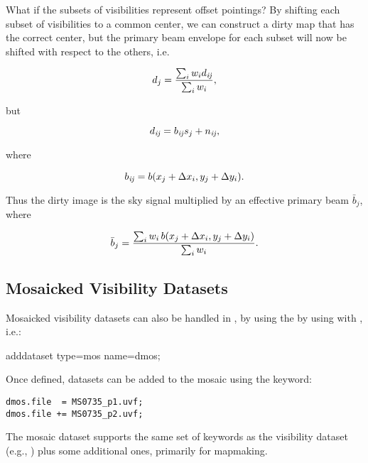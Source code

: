 What if the subsets of visibilities represent offset pointings?  By
shifting each subset of visibilities to a common center, we can
construct a dirty map that has the correct center, but the primary
beam envelope for each subset will now be shifted with respect to the
others, i.e.

\begin{equation}
d_j = {{\sum_{i}{w_i d_{{\it ij}}}}\over{\sum_{i}{w_i}}},
\end{equation}

but 

\begin{equation}
d_{{\it ij}} = b_{{\it ij}} s_j + n_{{\it ij}}, 
\end{equation}

where 

\begin{equation}
b_{{\it ij}} = b(x_j + \Delta x_i, y_j + \Delta y_i).
\end{equation}

Thus the dirty image is the sky signal multiplied by an effective primary beam $\bar{b}_j$, where

\begin{equation}
\bar{b}_j = {{\sum_i{w_i\,b(x_j + \Delta x_i, y_j + \Delta y_i)}}\over{\sum_i{w_i}}}.
\end{equation}

\subsection{Mosaicked Visibility Datasets}
\label{sec:mosaic}

Mosaicked visibility datasets can also be handled in \climax, by using the
by using  with , i.e.:

\begin{myindentpar}{3cm}
adddataset type=mos name=dmos;
\end{myindentpar}

Once defined, datasets can be added to the mosaic using the  keyword:

\begin{myindentpar}{3cm}
\begin{verbatim}
dmos.file  = MS0735_p1.uvf;
dmos.file += MS0735_p2.uvf;
\end{verbatim}
\end{myindentpar}

The mosaic dataset supports the same set of keywords as the 
visibility dataset (e.g., ) plus some
additional ones, primarily for mapmaking.

